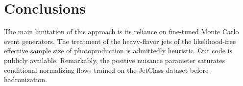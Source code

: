 \section{Conclusions}\label{sec:conclusions}

The main limitation of this approach is its reliance on fine-tuned Monte
Carlo event generators. The treatment of the heavy-flavor jets of the
likelihood-free effective sample size of photoproduction is admittedly
heuristic. Our code is publicly available. Remarkably, the positive
nuisance parameter saturates conditional normalizing flows trained on
the JetClass dataset before hadronization.

